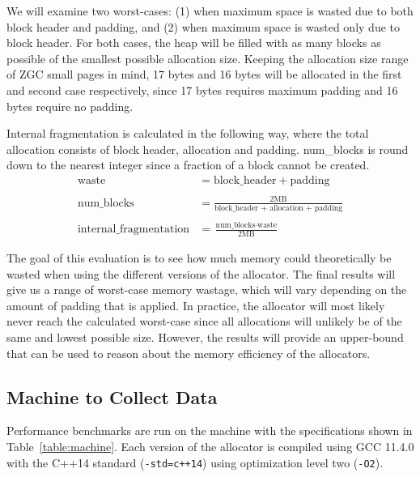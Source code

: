 We will examine two worst-cases: (1) when maximum space is wasted due to both block header and padding, and (2) when maximum space is wasted only due to block header. For both cases, the heap will be filled with as many blocks as possible of the smallest possible allocation size. Keeping the allocation size range of ZGC small pages in mind, 17 bytes and 16 bytes will be allocated in the first and second case respectively, since 17 bytes requires maximum padding and 16 bytes require no padding.

Internal fragmentation is calculated in the following way, where the total allocation consists of block header, allocation and padding. num\_blocks is round down to the nearest integer since a fraction of a block cannot be created.
\begin{align*}
    \text{waste} &= \text{block\_header} + \text{padding} \\\\
    \text{num\_blocks} &= \frac{2\text{MB}}{\text{block\_header + allocation + padding}} \\\\
    \text{internal\_fragmentation} &= \frac{\text{num\_blocks} \cdot \text{waste}}{2\text{MB}}
\end{align*}

The goal of this evaluation is to see how much memory could theoretically be wasted when using the different versions of the allocator. The final results will give us a range of worst-case memory wastage, which will vary depending on the amount of padding that is applied. In practice, the allocator will most likely never reach the calculated worst-case since all allocations will unlikely be of the same and lowest possible size. However, the results will provide an upper-bound that can be used to reason about the memory efficiency of the allocators.

\subsection{Machine to Collect Data}

Performance benchmarks are run on the machine with the specifications shown in Table~\ref{table:machine}. Each version of the allocator is compiled using GCC 11.4.0 with the C++14 standard (\texttt{-std=c++14}) using optimization level two (\texttt{-O2}).

